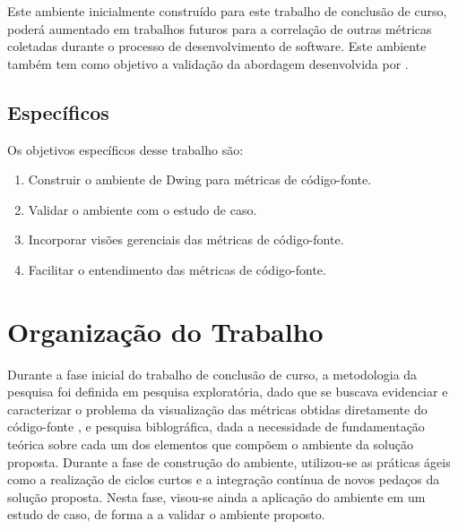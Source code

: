 Este ambiente inicialmente construído para este trabalho de conclusão de curso, poderá aumentado em trabalhos futuros para a correlação de outras métricas coletadas
durante o processo de desenvolvimento de software. Este ambiente também tem como objetivo a validação da abordagem desenvolvida por .



\subsection{Específicos}

Os objetivos específicos desse trabalho são:

\begin{enumerate}
	
\item Construir o ambiente de Dwing para métricas de código-fonte.
\item Validar o ambiente com o estudo de caso.
\item Incorporar visões gerenciais das métricas de código-fonte.
\item Facilitar o entendimento das métricas de código-fonte.

\end{enumerate}


\section{Organização do Trabalho}

Durante a fase inicial do trabalho de conclusão de curso, a metodologia da pesquisa foi definida em pesquisa exploratória, dado que se buscava evidenciar e caracterizar o problema da visualização das métricas obtidas diretamente do código-fonte , 
e pesquisa biblográfica, dada a necessidade de fundamentação teórica sobre cada um dos elementos que compõem o ambiente da solução proposta. Durante a fase de construção do ambiente, utilizou-se
as práticas ágeis como a realização de ciclos curtos e a integração contínua de novos pedaços da solução proposta. Nesta fase, visou-se ainda a aplicação do ambiente em um estudo de caso, 
de forma a  a validar o ambiente proposto.  

